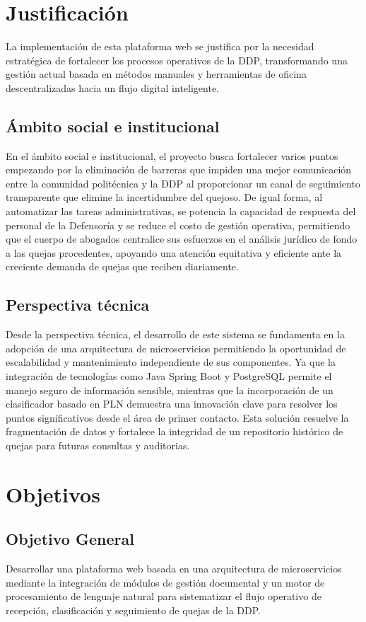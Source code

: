 \section{Justificación}
La implementación de esta plataforma web se justifica por la necesidad estratégica de fortalecer los procesos operativos de la DDP, transformando una gestión actual basada en métodos manuales y herramientas de oficina descentralizadas hacia un flujo digital inteligente.

\subsection{Ámbito social e institucional}
En el ámbito social e institucional, el proyecto busca fortalecer varios puntos empezando por la eliminación de barreras que impiden una mejor comunicación entre la comunidad politécnica y la DDP al proporcionar un canal de seguimiento transparente que elimine la incertidumbre del quejoso. De igual forma, al automatizar las tareas administrativas, se potencia la capacidad de respuesta del personal de la Defensoría y se reduce el costo de gestión operativa, permitiendo que el cuerpo de abogados centralice sus esfuerzos en el análisis jurídico de fondo a las quejas procedentes, apoyando una atención equitativa y eficiente ante la creciente demanda de quejas que reciben diariamente.

\subsection{Perspectiva técnica}
Desde la perspectiva técnica, el desarrollo de este sistema se fundamenta en la adopción de una arquitectura de microservicios permitiendo la oportunidad de escalabilidad y mantenimiento independiente de sus componentes. Ya que la integración de tecnologías como Java Spring Boot y PostgreSQL permite el manejo seguro de información sensible, mientras que la incorporación de un clasificador basado en PLN demuestra una innovación clave para resolver los puntos significativos desde el área de primer contacto. Esta solución resuelve la fragmentación de datos y fortalece la integridad de un repositorio histórico de quejas para futuras consultas y auditorias.

\section{Objetivos}

\subsection{Objetivo General}
Desarrollar una plataforma web basada en una arquitectura de microservicios mediante la integración de módulos de gestión documental y un motor de procesamiento de lenguaje natural para sistematizar el flujo operativo de recepción, clasificación y seguimiento de quejas de la DDP.

